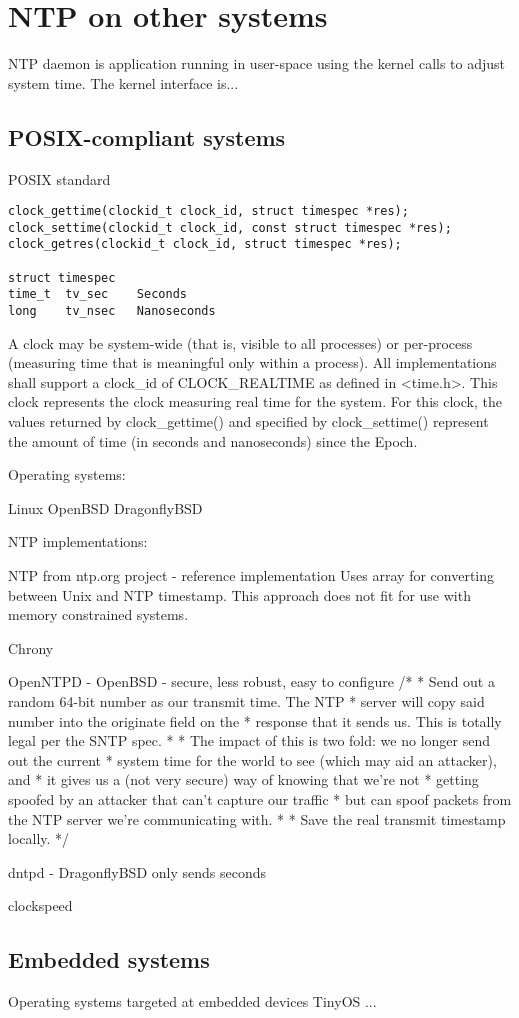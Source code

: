 
\chapter{NTP on other systems}

NTP daemon is application running in user-space using the kernel calls to adjust system time.
The kernel interface is...

\section{POSIX-compliant systems}
POSIX standard
\begin{lstlisting}[morekeywords={clockid_t,time_t}]
clock_gettime(clockid_t clock_id, struct timespec *res);
clock_settime(clockid_t clock_id, const struct timespec *res);
clock_getres(clockid_t clock_id, struct timespec *res);

struct timespec
time_t  tv_sec    Seconds
long    tv_nsec   Nanoseconds
\end{lstlisting}
A clock may be system-wide (that is, visible to all processes)
or per-process (measuring time that is meaningful only within a process).
All implementations shall support a clock\_id of CLOCK\_REALTIME as
defined in <time.h>.
This clock represents the clock measuring real time for the system.
For this clock, the values returned by clock\_gettime() and specified
by clock\_settime() represent the amount
of time (in seconds and nanoseconds) since the Epoch.


Operating systems:

Linux
OpenBSD
DragonflyBSD

NTP implementations:

NTP from ntp.org project - reference implementation
Uses array for converting between Unix and NTP timestamp.
This approach does not fit for use with memory constrained systems.

Chrony

OpenNTPD - OpenBSD - secure, less robust, easy to configure
	/*
	 * Send out a random 64-bit number as our transmit time.  The NTP
	 * server will copy said number into the originate field on the
	 * response that it sends us.  This is totally legal per the SNTP spec.
	 *
	 * The impact of this is two fold: we no longer send out the current
	 * system time for the world to see (which may aid an attacker), and
	 * it gives us a (not very secure) way of knowing that we're not
	 * getting spoofed by an attacker that can't capture our traffic
	 * but can spoof packets from the NTP server we're communicating with.
	 *
	 * Save the real transmit timestamp locally.
	 */

dntpd - DragonflyBSD
only sends seconds


clockspeed

\section{Embedded systems}
Operating systems targeted at embedded devices
TinyOS
...
